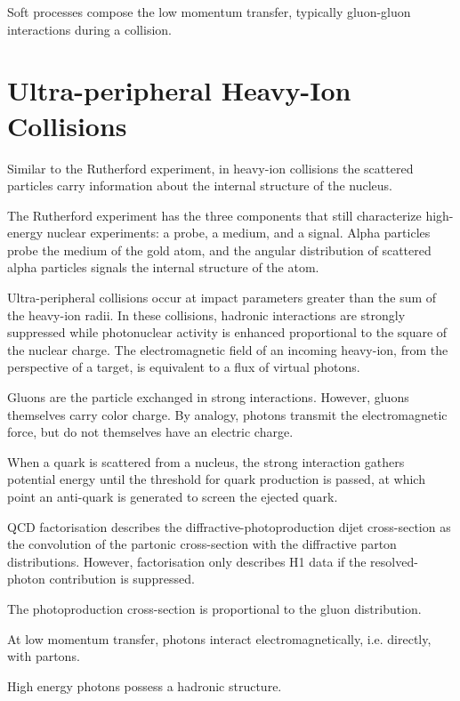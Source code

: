 Soft processes compose the low momentum transfer, typically gluon-gluon interactions during a  collision.

\section{Ultra-peripheral Heavy-Ion Collisions}

Similar to the Rutherford experiment, in heavy-ion collisions the scattered particles carry information about the internal structure of the nucleus. 

The Rutherford experiment has the three components that still characterize high-energy nuclear experiments: a probe, a medium, and a signal. Alpha particles probe the medium of the gold atom, and the angular distribution of scattered alpha particles signals the internal structure of the atom. 

Ultra-peripheral collisions occur at impact parameters greater than the sum of the heavy-ion radii. In these collisions, hadronic interactions are strongly suppressed while photonuclear activity is enhanced proportional to the square of the nuclear charge. The electromagnetic field of an incoming heavy-ion, from the perspective of a target, is equivalent to a flux of virtual photons. 

Gluons are the particle exchanged in strong interactions. However, gluons themselves carry color charge. By analogy, photons transmit the electromagnetic force, but do not themselves have an electric charge. 

When a quark is scattered from a nucleus, the strong interaction gathers potential energy until the threshold for quark production is passed, at which point an anti-quark is generated to screen the ejected quark.

QCD factorisation describes the diffractive-photoproduction dijet cross-section as the convolution of the partonic cross-section with the diffractive parton distributions. However, factorisation only describes H1 data if the resolved-photon contribution is suppressed. 

The photoproduction cross-section is proportional to the gluon distribution.

At low momentum transfer, photons interact electromagnetically, i.e. directly, with partons. 

High energy photons possess a hadronic structure. 